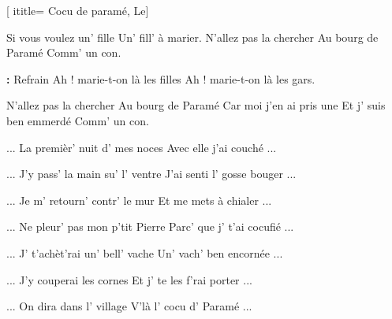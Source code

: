  [
ititle= {Cocu de paramé, Le}]


\beginverse
Si vous voulez un' fille
Un' fill' à marier.
N'allez pas la chercher
Au bourg de Paramé
Comm' un con.
\endverse

\beginchorus
\textbf: {Refrain}
Ah ! marie-t-on là les filles
Ah ! marie-t-on là les gars.
\endchorus

\beginverse
N'allez pas la chercher
Au bourg de Paramé
Car moi j'en ai pris une
Et j' suis ben emmerdé
Comm' un con.
\endverse

\beginverse
... La premièr' nuit d' mes noces
Avec elle j'ai couché ...
\endverse

\beginverse
... J'y pass' la main su' l' ventre
J'ai senti l' gosse bouger ...
\endverse

\beginverse
... Je m' retourn' contr' le mur
Et me mets à chialer ...
\endverse

\beginverse
... Ne pleur' pas mon p'tit Pierre
Parc' que j' t'ai cocufié ...
\endverse

\beginverse
... J' t'achèt'rai un' bell' vache
Un' vach' ben encornée ...
\endverse

\beginverse
... J'y couperai les cornes
Et j' te les f'rai porter ...
\endverse

\beginverse
... On dira dans l' village
V'là l' cocu d' Paramé ...
\endverse

\endsong
